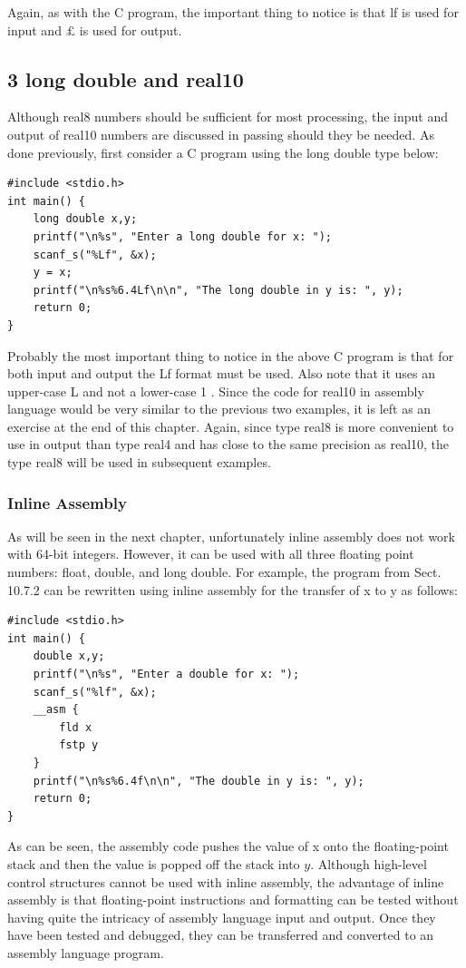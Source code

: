 \documentclass[10pt]{article}
\begin{document}
Again, as with the C program, the important thing to notice is that lf is used for input and $\pounds$ is used for output.

\subsection*{3 long double and real10}
Although real8 numbers should be sufficient for most processing, the input and output of real10 numbers are discussed in passing should they be needed. As done previously, first consider a C program using the long double type below:

\begin{verbatim}
#include <stdio.h>
int main() {
    long double x,y;
    printf("\n%s", "Enter a long double for x: ");
    scanf_s("%Lf", &x);
    y = x;
    printf("\n%s%6.4Lf\n\n", "The long double in y is: ", y);
    return 0;
}
\end{verbatim}

Probably the most important thing to notice in the above C program is that for both input and output the Lf format must be used. Also note that it uses an upper-case L and not a lower-case 1 . Since the code for real10 in assembly language would be very similar to the previous two examples, it is left as an exercise at the end of this chapter. Again, since type real8 is more convenient to use in output than type real4 and has close to the same precision as real10, the type real8 will be used in subsequent examples.

\subsubsection*{Inline Assembly}
As will be seen in the next chapter, unfortunately inline assembly does not work with 64-bit integers. However, it can be used with all three floating point numbers: float, double, and long double. For example, the program from Sect. 10.7.2 can be rewritten using inline assembly for the transfer of x to y as follows:

\begin{verbatim}
#include <stdio.h>
int main() {
    double x,y;
    printf("\n%s", "Enter a double for x: ");
    scanf_s("%lf", &x);
    __asm {
        fld x
        fstp y
    }
    printf("\n%s%6.4f\n\n", "The double in y is: ", y);
    return 0;
}
\end{verbatim}

As can be seen, the assembly code pushes the value of x onto the floating-point stack and then the value is popped off the stack into $y$. Although high-level control structures cannot be used with inline assembly, the advantage of inline assembly is that floating-point instructions and formatting can be tested without having quite the intricacy of assembly language input and output. Once they have been tested and debugged, they can be transferred and converted to an assembly language program.
\end{document}
